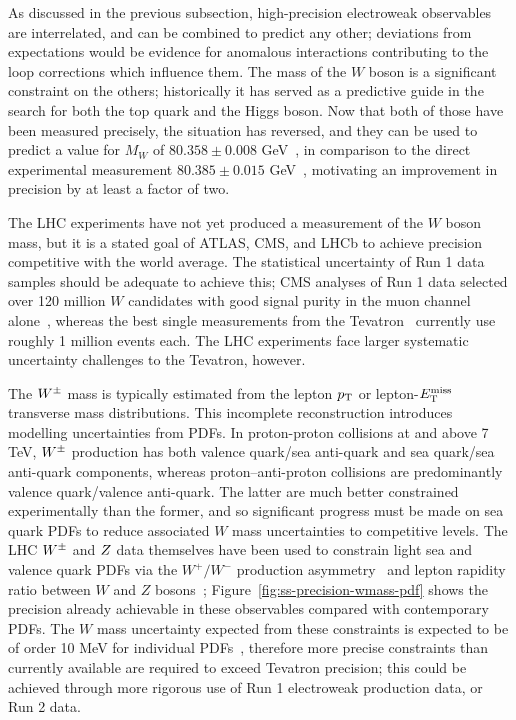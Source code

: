 
As discussed in the previous subsection, high-precision electroweak
observables are interrelated, and can be combined to predict any
other; deviations from expectations would be evidence for anomalous
interactions contributing to the loop corrections which influence
them.  The mass of the $W$ boson is a significant constraint on the
others; historically it has served as a predictive guide in the search for
both the top quark and the Higgs boson.  Now that both of those have been
measured precisely, the situation has reversed, and they can be used
to predict a value for $M_W$ of $80.358 \pm 0.008$
GeV~\cite{Baak:2014ora}, in comparison to the direct experimental
measurement $80.385 \pm 0.015$ GeV~\cite{Aaltonen:2013iut}, motivating
an improvement in precision by at least a factor of two.

The LHC experiments have not yet produced a measurement of the $W$
boson mass, but it is a stated goal of ATLAS, CMS, and LHCb to achieve
precision competitive with the world average.  The statistical
uncertainty of Run 1 data samples should be adequate to achieve this;
CMS analyses of Run 1 data selected over 120 million $W$ candidates
with good signal purity in the muon channel
alone~\cite{Chatrchyan:2013mza,Khachatryan:2016pev},
whereas the best single measurements from the
Tevatron~\cite{Aaltonen:2012bp,Abazov:2012bv} currently use roughly 1
million events each.  The LHC experiments face larger systematic
uncertainty challenges to the Tevatron, however.

The $W^{\pm}$ mass is typically estimated from the lepton $p_{\mathrm{T}}$ or
lepton-$E_{\mathrm{T}}^{\mathrm{miss}}$ transverse mass distributions.  This incomplete
reconstruction introduces modelling uncertainties from PDFs. In
proton-proton collisions at and above 7 TeV, $W^{\pm}$ production has both
valence quark/sea anti-quark and sea quark/sea anti-quark components,
whereas proton--anti-proton collisions are predominantly valence
quark/valence anti-quark.  The latter are much better constrained
experimentally than the former, and so significant progress must be
made on sea quark PDFs to reduce associated $W$ mass uncertainties to
competitive levels.  The LHC $W^{\pm}$ and $Z$ data themselves have been used to
constrain light sea and valence quark PDFs via the $W^+/W^-$
production
asymmetry~\cite{Khachatryan:2016pev,Aaij:2014wba,Chatrchyan:2013mza,Chatrchyan:2012xt,Aad:2011dm}
and lepton rapidity ratio between $W$ and $Z$
bosons~\cite{Aad:2011dm,Aad:2012sb};
Figure~\ref{fig:ss-precision-wmass-pdf} shows the precision already
achievable in these observables compared with contemporary PDFs.  The
$W$ mass uncertainty expected from these constraints is expected to be
of order 10 MeV for individual PDFs~\cite{Bozzi:2015hha,Bozzi:2011ww},
therefore more precise constraints than currently available are
required to exceed Tevatron precision; this could be achieved through
more rigorous use of Run 1 electroweak production data, or Run 2 data.

